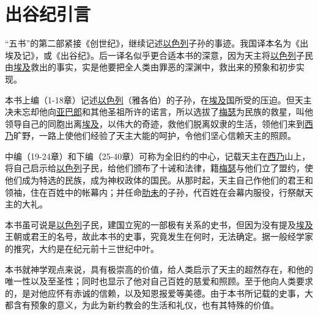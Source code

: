 \chapter{出谷纪引言}

“五书”的第二部紧接《创世纪》，继续记述\uline{以色列}子孙的事迹。我国译本名为《出埃及记》，或《出谷纪》。后一译名似乎更合适本书的深意，因为天主将\uline{以色列}子民由\uline{埃及}救出的事实，实是他要把全人类由罪恶的深渊中，救出来的预象和初步实现。

本书上编（1-18章）记述\uline{以色列}（雅各伯）的子孙，在\uline{埃及}国所受的压迫。但天主决未忘却他向\uline{亚巴郎}和其他圣祖所许的诺言，所以选拔了\uline{梅瑟}为民族的救星，叫他领导自己的同胞出离\uline{埃及}，以伟大的奇迹，救他们脱离奴隶的生活，领他们来到\uline{西乃}旷野，一路上使他们经验了天主大能的呵护，令他们坚心信赖天主的照顾。

中编（19-24章）和下编（25-40章）可称为全旧约的中心，记载天主在\uline{西乃}山上，将自己启示给\uline{以色列}子民，给他们颁布了十诫和法律，籍\uline{梅瑟}与他们立了盟约，使他们成为特选的民族，成为神权政体的国民。从那时起，天主自己作他们的君王和领袖，住在百姓中的帐幕内；并任命\uline{肋未}的子孙，代百姓在会幕内服役，行祭献天主的大礼。

本书虽可说是\uline{以色列}子民，建国立宪的一部极有关系的史书，但因为没有提及\uline{埃及}王朝或君王的名号，故此本书的史事，究竟发生在何时，无法确定。据一般经学家的推究，大约是在纪元前十三世纪中叶。

本书就神学观点来说，具有极崇高的价值，给人类启示了天主的超然存在，和他的唯一性以及至圣性；同时也显示了他对自己百姓的慈爱和照顾。至于他向人类要求的，是对他应怀有赤诚的信赖，以及知恩报爱等美德。由于本书所记载的史事，大都含有预象的意义，为此为新约教会的生活和礼仪，也有其特殊的价值。